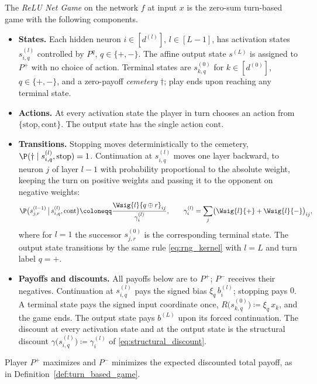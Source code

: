 \begin{definition}\label{def:relu_net_game}
The \emph{ReLU Net Game} on the network $f$ at input $x$ is the zero-sum turn-based game with the following components.
\begin{itemize}
	\item \textbf{States.} Each hidden neuron $i\in[d^{(l)}]$, $l\in[L-1]$, has activation states $s^{(l)}_{i,q}$ controlled by $P^q$, $q\in\{+,-\}$. The affine output state $s^{(L)}$ is assigned to $P^+$ with no choice of action. Terminal states are $s^{(0)}_{k,q}$ for $k\in[d^{(0)}]$, $q\in\{+,-\}$, and a zero-payoff \emph{cemetery} $\dagger$; play ends upon reaching any terminal state.
	\item \textbf{Actions.} At every activation state the player in turn chooses an action from $\{\mathrm{stop}, \mathrm{cont}\}$. The output state has the single action $\mathrm{cont}$.
	\item \textbf{Transitions.} Stopping moves deterministically to the cemetery, $\P(\dagger \mid s^{(l)}_{i,q}, \mathrm{stop}) = 1$. Continuation at $s^{(l)}_{i,q}$ moves one layer backward, to neuron $j$ of layer $l-1$ with probability proportional to the absolute weight, keeping the turn on positive weights and passing it to the opponent on negative weights:
	\begin{equation}
		\P\bigl( s^{(l-1)}_{j,r} \,\big|\, s^{(l)}_{i,q}, \mathrm{cont} \bigr)
		\coloneqq \frac{\Wsig{l}{q \oplus r}_{ij}}{\gamma^{(l)}_i},
		\qquad
		\gamma^{(l)}_i = \sum_{j} \bigl( \Wsig{l}{+} + \Wsig{l}{-} \bigr)_{ij},
		\label{eq:rng_kernel}
	\end{equation}
	where for $l = 1$ the successor $s^{(0)}_{j,r}$ is the corresponding terminal state. The output state transitions by the same rule \eqref{eq:rng_kernel} with $l = L$ and turn label $q = +$.
	\item \textbf{Payoffs and discounts.} All payoffs below are to $P^+$; $P^-$ receives their negatives. Continuation at $s^{(l)}_{i,q}$ pays the signed bias $\xi_{q}\, b^{(l)}_i$; stopping pays $0$. A terminal state pays the signed input coordinate once, $R\bigl(s^{(0)}_{k,q}\bigr) \coloneqq \xi_{q}\, x_k$, and the game ends. The output state pays $b^{(L)}$ upon its forced continuation. The discount at every activation state and at the output state is the structural discount $\gamma\bigl(s^{(l)}_{i,q}\bigr) \coloneqq \gamma^{(l)}_i$ of \eqref{eq:structural_discount}.
\end{itemize}
Player $P^{+}$ maximizes and $P^{-}$ minimizes the expected discounted total payoff, as in Definition~\ref{def:turn_based_game}.
\end{definition}


